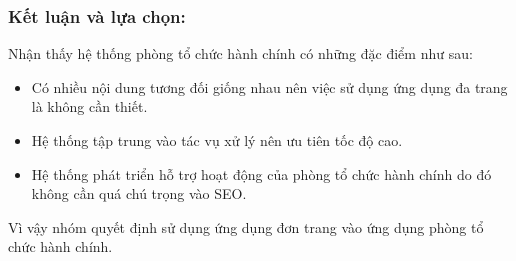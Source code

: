\subsubsection{Kết luận và lựa chọn:}
Nhận thấy hệ thống phòng tổ chức hành chính có những đặc điểm như sau:
\begin {itemize}
    \item Có nhiều nội dung tương đối giống nhau nên việc sử dụng ứng dụng đa trang là không cần thiết.
    \item Hệ thống tập trung vào tác vụ xử lý nên ưu tiên tốc độ cao.
    \item Hệ thống phát triển hỗ trợ hoạt động của phòng tổ chức hành chính do đó không cần quá chú trọng vào SEO.
\end {itemize}

Vì vậy nhóm quyết định sử dụng ứng dụng đơn trang vào ứng dụng phòng tổ chức hành chính.




